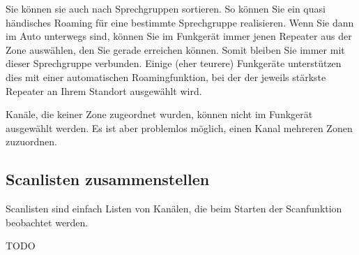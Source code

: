 Sie können sie auch nach Sprechgruppen sortieren. So können Sie ein quasi händisches Roaming für eine bestimmte Sprechgruppe realisieren. Wenn Sie dann im Auto unterwegs sind, können Sie im Funkgerät immer jenen Repeater aus der Zone auswählen, den Sie gerade erreichen können. Somit bleiben Sie immer mit dieser Sprechgruppe verbunden. Einige (eher teurere) Funkgeräte unterstützen dies mit einer automatischen Roamingfunktion, bei der der jeweils stärkste Repeater an Ihrem Standort ausgewählt wird.

\begin{hinweis}
 Kanäle, die keiner Zone zugeordnet wurden, können nicht im Funkgerät ausgewählt werden. Es ist aber problemlos möglich, einen Kanal mehreren Zonen zuzuordnen.
\end{hinweis}

\subsection{Scanlisten zusammenstellen}
Scanlisten sind einfach Listen von Kanälen, die beim Starten der Scanfunktion beobachtet werden.

TODO
